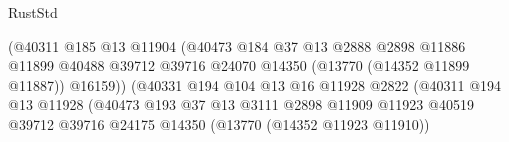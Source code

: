 \begin{lexlean}{RustStd}
\begin{coremodule}
                                                (@40311
                                                  @185
                                                  @13
                                                  @11904
                                                  (@40473
                                                    @184
                                                    @37
                                                    @13
                                                    @2888
                                                    @2898
                                                    @11886
                                                    @11899
                                                    @40488
                                                    @39712
                                                    @39716
                                                    @24070
                                                    @14350
                                                    (@13770 (@14352 @11899 @11887))
                                                    @16159))
                                                (@40331
                                                  @194
                                                  @104
                                                  @13
                                                  @16
                                                  @11928
                                                  @2822
                                                  (@40311
                                                    @194
                                                    @13
                                                    @11928
                                                    (@40473
                                                      @193
                                                      @37
                                                      @13
                                                      @3111
                                                      @2898
                                                      @11909
                                                      @11923
                                                      @40519
                                                      @39712
                                                      @39716
                                                      @24175
                                                      @14350
                                                      (@13770 (@14352 @11923 @11910))

\end{coremodule}
\end{lexlean}
